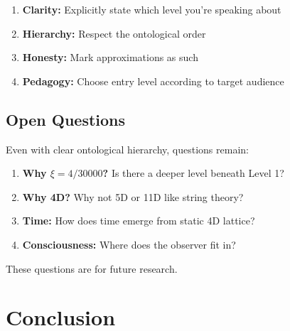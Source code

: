 	\begin{enumerate}
		\item \textbf{Clarity:} Explicitly state which level you're speaking about
		\item \textbf{Hierarchy:} Respect the ontological order
		\item \textbf{Honesty:} Mark approximations as such
		\item \textbf{Pedagogy:} Choose entry level according to target audience
	\end{enumerate}
	
	\subsection{Open Questions}
	
	\begin{question}
		Even with clear ontological hierarchy, questions remain:
		
		\begin{enumerate}
			\item \textbf{Why $\xi = 4/30000$?} Is there a deeper level beneath Level 1?
			\item \textbf{Why 4D?} Why not 5D or 11D like string theory?
			\item \textbf{Time:} How does time emerge from static 4D lattice?
			\item \textbf{Consciousness:} Where does the observer fit in?
		\end{enumerate}
		
		These questions are for future research.
	\end{question}
	
	\section{Conclusion}
	
